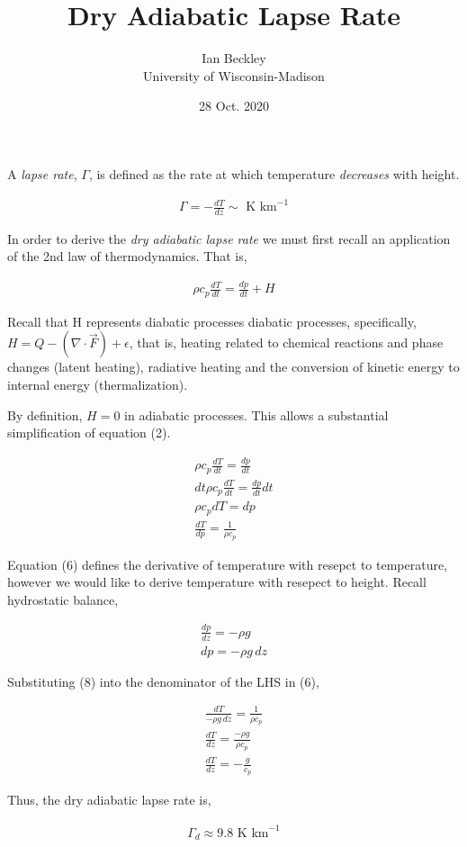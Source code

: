 \documentclass[a4paper,12pt]{article}
\begin{document}
\title{\vspace{-4.0cm}Dry Adiabatic Lapse Rate}
\author{Ian Beckley
\\University of Wisconsin-Madison}

\date{28 Oct. 2020}

\maketitle
A \emph{lapse rate}, $\Gamma$, is defined as the rate at which temperature \emph{decreases} with height. 

\begin{align}
\Gamma = -\frac{dT}{dz} \sim \text{ K km}^{-1}
\end{align}

In order to derive the \emph{dry adiabatic lapse rate} we must first recall an application of the 2nd law of thermodynamics. That is,

\begin{align}
\rho c_p \frac{dT}{dt} = \frac{dp}{dt} + H
\end{align}

Recall that H represents diabatic processes diabatic processes, specifically, $H = Q - (\nabla \cdot \vec F) + \epsilon$, that is, heating related to chemical reactions and phase changes (latent heating), radiative heating and the conversion of kinetic energy to internal energy (thermalization).

By definition, $H=0$ in adiabatic processes. This allows a substantial simplification of equation (2).

\begin{align}
\rho c_p \frac{dT}{dt} = \frac{dp}{dt}\\
dt \rho c_p \frac{dT}{dt} = \frac{dp}{dt} dt\\
\rho c_p dT = dp\\
\frac{dT}{dp} = \frac{1}{\rho c_p}
\end{align}

Equation (6) defines the derivative of temperature with resepct to temperature, however we would like to derive temperature with resepect to height. Recall hydrostatic balance,

\begin{align}
\frac{dp}{dz} = -\rho g\\
dp = -\rho g \, dz
\end{align}

Substituting (8) into the denominator of the LHS in (6),

\begin{align*}
\frac{dT}{-\rho g \, dz} = \frac{1}{\rho c_p}\\
\frac{dT}{dz} = \frac{-\rho g}{\rho c_p}\\
\frac{dT}{dz} = -\frac{g}{c_p}
\end{align*}

Thus, the dry adiabatic lapse rate is,

\begin{align*}
\boxed{\Gamma_d \approx 9.8 \text{ K km}^{-1}}
\end{align*}
\end{document}
